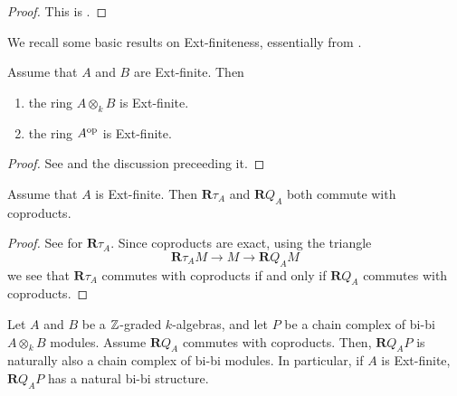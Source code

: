 \begin{proof}
  This is \cite[Proposition 3.8 (1)]{AZ94}.
\end{proof}

We recall some basic results on Ext-finiteness, essentially from \cite[Section 4]{VdB}.

\begin{proposition} \label{proposition: tensor and op properties of ext-finite}
  Assume that \(A\) and \(B\) are Ext-finite. Then
  \begin{enumerate}
  \item the ring \(A \otimes_k B\) is Ext-finite. 
  \item the ring \(A^{\operatorname{op}}\) is Ext-finite.
  \end{enumerate}
\end{proposition}

\begin{proof}
  See \cite[Lemma 4.2]{VdB} and the discussion preceeding it. 
\end{proof}

\begin{proposition} \label{proposition: derived Q commutes with coproducts}
  Assume that \(A\) is Ext-finite. Then \(\mathbf{R}\tau_A\) and \(\mathbf{R}Q_A\) both commute with coproducts. 
\end{proposition}

\begin{proof}
  See \cite[Lemma 4.3]{VdB} for \(\mathbf{R}\tau_A\). Since coproducts are exact, using the triangle
  \begin{displaymath}
    \mathbf{R}\tau_A M \to M \to \mathbf{R}Q_A M 
  \end{displaymath}
  we see that \(\mathbf{R}\tau_A\) commutes with coproducts if and only if \(\mathbf{R}Q_A\) commutes with coproducts. 
\end{proof}

\begin{corollary} \label{corollary: Q preserves bimodules}
  Let \(A\) and \(B\) be a \(\mathbb{Z}\)-graded \(k\)-algebras, and let \(P\) be a chain complex of bi-bi \(A \otimes_k B\) modules. Assume \(\mathbf{R}Q_A\) commutes with coproducts. Then, \(\mathbf{R}Q_A P\) is naturally also a chain complex of bi-bi modules. In particular, if \(A\) is Ext-finite, \(\mathbf{R}Q_A P\) has a natural bi-bi structure. 
\end{corollary}

